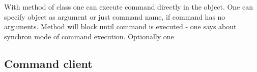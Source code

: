      

 
With method  of class  one can execute 
command directly in the object. One can specify  object as argument
or just command name, if command has no arguments. Method  will block
until command is executed - one says about synchron mode of command execution. Optionally
one 

 
 

\subsection{Command client}
